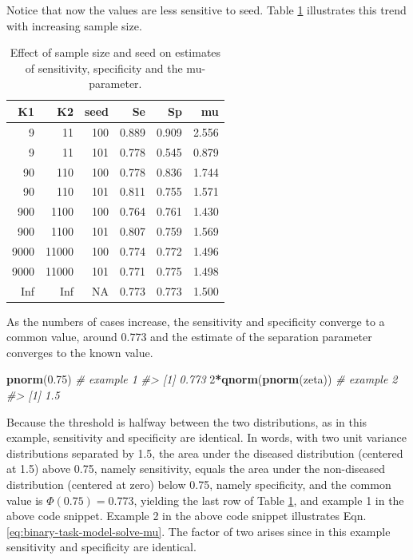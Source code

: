 \documentclass[
]{book}
\newenvironment{Shaded}{\begin{snugshade}}{\end{snugshade}}
\newcommand{\CommentTok}[1]{\textcolor[rgb]{0.56,0.35,0.01}{\textit{#1}}}
\newcommand{\DecValTok}[1]{\textcolor[rgb]{0.00,0.00,0.81}{#1}}
\newcommand{\FloatTok}[1]{\textcolor[rgb]{0.00,0.00,0.81}{#1}}
\newcommand{\KeywordTok}[1]{\textcolor[rgb]{0.13,0.29,0.53}{\textbf{#1}}}
\newcommand{\NormalTok}[1]{#1}
\newcommand{\OperatorTok}[1]{\textcolor[rgb]{0.81,0.36,0.00}{\textbf{#1}}}
\begin{document}
Notice that now the values are less sensitive to seed. Table \ref{tab:binary-task-model-table} illustrates this trend with increasing sample size.

\begin{table}

\caption{\label{tab:binary-task-model-table}Effect of sample size and seed on estimates of sensitivity, specificity and the mu-parameter.}
\centering
\begin{tabular}[t]{r|r|r|r|r|r}
\hline
K1 & K2 & seed & Se & Sp & mu\\
\hline
9 & 11 & 100 & 0.889 & 0.909 & 2.556\\
\hline
9 & 11 & 101 & 0.778 & 0.545 & 0.879\\
\hline
90 & 110 & 100 & 0.778 & 0.836 & 1.744\\
\hline
90 & 110 & 101 & 0.811 & 0.755 & 1.571\\
\hline
900 & 1100 & 100 & 0.764 & 0.761 & 1.430\\
\hline
900 & 1100 & 101 & 0.807 & 0.759 & 1.569\\
\hline
9000 & 11000 & 100 & 0.774 & 0.772 & 1.496\\
\hline
9000 & 11000 & 101 & 0.771 & 0.775 & 1.498\\
\hline
Inf & Inf & NA & 0.773 & 0.773 & 1.500\\
\hline
\end{tabular}
\end{table}

As the numbers of cases increase, the sensitivity and specificity converge to a common value, around 0.773 and the estimate of the separation parameter converges to the known value.

\begin{Shaded}
\begin{Highlighting}[]
\KeywordTok{pnorm}\NormalTok{(}\FloatTok{0.75}\NormalTok{) }\CommentTok{# example 1}
\CommentTok{#> [1] 0.773}
\DecValTok{2}\OperatorTok{*}\KeywordTok{qnorm}\NormalTok{(}\KeywordTok{pnorm}\NormalTok{(zeta)) }\CommentTok{# example 2}
\CommentTok{#> [1] 1.5}
\end{Highlighting}
\end{Shaded}

Because the threshold is halfway between the two distributions, as in this example, sensitivity and specificity are identical. In words, with two unit variance distributions separated by 1.5, the area under the diseased distribution (centered at 1.5) above 0.75, namely sensitivity, equals the area under the non-diseased distribution (centered at zero) below 0.75, namely specificity, and the common value is \(\Phi(0.75)= 0.773\), yielding the last row of Table \ref{tab:binary-task-model-table}, and example 1 in the above code snippet. Example 2 in the above code snippet illustrates Eqn. \eqref{eq:binary-task-model-solve-mu}. The factor of two arises since in this example sensitivity and specificity are identical.
\end{document}
